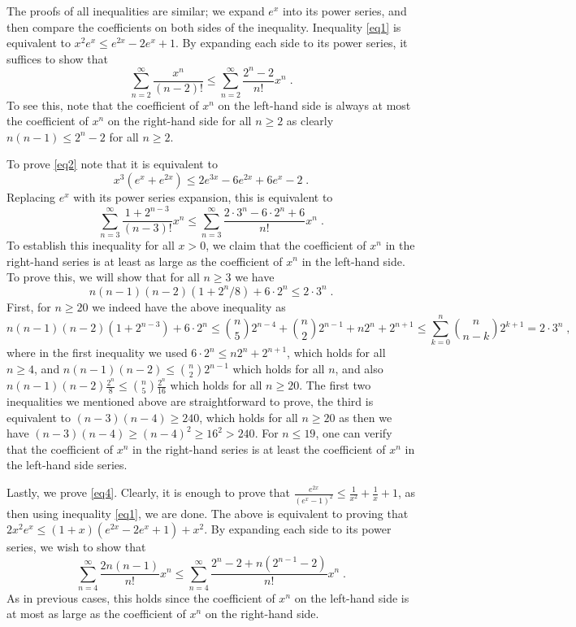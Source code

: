 \documentclass[11pt]{article}
\makeatletter
\theoremstyle{plain}
\renewenvironment{proof}[1][\proofname]
{\par\pushQED{\qed}
	\normalfont\topsep6\p@\@plus6\p@\relax\trivlist
	\item[\hskip\labelsep\bfseries#1\@addpunct{.}]
	\ignorespaces}
{\popQED\endtrivlist\@endpefalse}
\makeatother
\begin{document}
\begin{proof}
The proofs of all inequalities are similar; we expand $e^x$ into its power series, and then compare the coefficients on both
sides of the inequality. Inequality \eqref{eq1} is equivalent to
$
    x^2e^x\leq e^{2x}-2e^{x}+1.
$
By expanding each side to its power series, it suffices to show that
\[
    \sum_{n=2}^{\infty}\frac{x^n}{(n-2)!} \leq \sum_{n=2}^{\infty}\frac{2^n-2}{n!}x^n\;.
\]
To see this, note that the coefficient of $x^n$ on the left-hand side is always at most the coefficient of $x^n$ on the right-hand side for all $n\geq 2$ as clearly $n(n-1)\leq 2^n-2$ for all $n\geq 2$.

To prove \eqref{eq2} note that it is equivalent to
\[
    x^3(e^x+e^{2x})\leq 2e^{3x}-6e^{2x}+6e^{x}-2\;.
\]
Replacing $e^x$ with its power series expansion, this is equivalent to
\[
    \sum_{n=3}^{\infty}\frac{1+2^{n-3}}{(n-3)!}x^{n}\leq
    \sum_{n=3}^{\infty}\frac{2\cdot 3^n-6\cdot 2^n+6}{n!}x^{n}\;.
\]
To establish this inequality for all $x>0$, we claim that the coefficient of $x^n$ in the right-hand series is at least as large as the coefficient of $x^n$ in the left-hand side. To prove this, we will show that for all $n \geq 3$ we have
\[
    n(n-1)(n-2)(1+2^n/8)+6\cdot 2^n\leq 2\cdot 3^n\;.
\]
First, for $n\geq 20$ we indeed have the above inequality as
$$
    n(n-1)(n-2)(1+2^{n-3})+6\cdot 2^n \leq  \binom{n}{5}{2^{n-4}}+\binom{n}{2}2^{n-1}+ n2^n+2^{n+1} \leq \sum_{k=0}^n \binom{n}{n-k}2^{k+1}= 2\cdot 3^n\;,
$$
where in the first inequality we used $6\cdot 2^{n}\leq n2^n+2^{n+1}$, which holds for all $n\geq 4$, and $n(n-1)(n-2)\leq \binom{n}{2}2^{n-1}$ which holds for all $n$, and also $ n(n-1)(n-2)\frac{2^n}{8}\leq \binom{n}{5}\frac{2^{n}}{16}$ which holds for all $n\geq 20$.
The first two inequalities we mentioned above are straightforward to prove, the third is equivalent to $(n-3)(n-4)\geq 240$, which holds for all $n\geq 20$ as then we have $(n-3)(n-4)\geq (n-4)^2\geq 16^2>240$.
For $n\leq 19$, one can verify that the coefficient of $x^n$ in the right-hand series is at least the coefficient of $x^n$ in the left-hand side series.

Lastly, we prove \eqref{eq4}. Clearly, it is enough to prove that $\frac{e^{2x}}{(e^{x}-1)^2}\leq \frac{1}{x^2}+\frac{1}{x}+1$, as then using inequality \eqref{eq1}, we are done.
The above is equivalent to proving that
    $
        2x^2e^{x}\leq (1+x)(e^{2x}-2e^{x}+1)+x^2.
    $
    By expanding each side to its power series, we wish to show that
    \[
        \sum_{n=4}^{\infty}\frac{2n(n-1)}{n!}x^n\leq \sum_{n=4}^{\infty} \frac{2^n-2+n(2^{n-1}-2)}{n!}x^{n}\;.
    \]
    As in previous cases, this holds since the coefficient of $x^{n}$ on the left-hand side is at most as large as the coefficient of $x^{n}$ on the right-hand side.
\end{proof}



	
\end{document}

